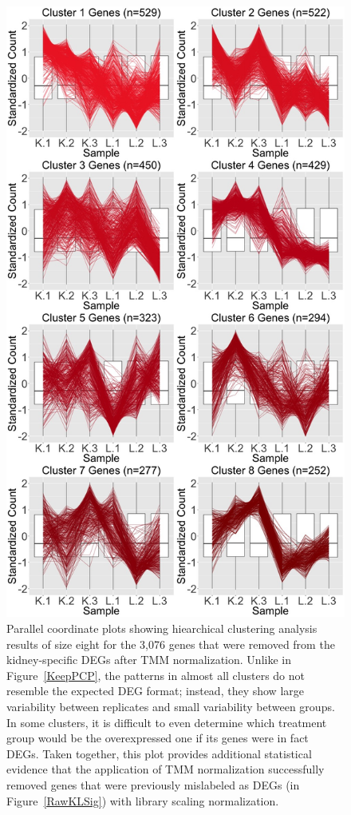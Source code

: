 \documentclass{article}
\begin{document}
\null
\begin{figure}[t!]
\centerline{\includegraphics[width=0.65\columnwidth]{../Bioinformatics/Pictures/liverKidney/Clustering_data_FDR_001_TMMvRaw_Removed/K_L_8.jpg}}
\caption{Parallel coordinate plots showing hiearchical clustering analysis results of size eight for the 3,076 genes that were removed from the kidney-specific DEGs after TMM normalization. Unlike in Figure~\ref{KeepPCP}, the patterns in almost all clusters do not resemble the expected DEG format; instead, they show large variability between replicates and small variability between groups. In some clusters, it is difficult to even determine which treatment group would be the overexpressed one if its genes were in fact DEGs. Taken together, this plot provides additional statistical evidence that the application of TMM normalization successfully removed genes that were previously mislabeled as DEGs (in Figure~\ref{RawKLSig}) with library scaling normalization.
\label{RemovePCP}}
\end{figure}
\end{document}
